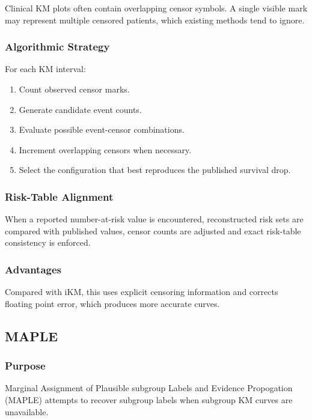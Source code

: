 \documentclass[11pt]{article}
\begin{document}
Clinical KM plots often contain overlapping censor symbols. A single visible mark may represent multiple censored patients, which existing methods tend to ignore.

\subsubsection*{Algorithmic Strategy}

For each KM interval:

\begin{enumerate}
    \item Count observed censor marks.
    \item Generate candidate event counts.
    \item Evaluate possible event-censor combinations.
    \item Increment overlapping censors when necessary.
    \item Select the configuration that best reproduces the published survival drop.
\end{enumerate}

\subsubsection*{Risk-Table Alignment}

When a reported number-at-risk value is encountered, reconstructed risk sets are compared with published values, censor counts are adjusted and exact risk-table consistency is enforced.

\subsubsection*{Advantages}

Compared with iKM, this uses explicit censoring information and corrects floating point error, which produces more accurate curves.

\subsection*{MAPLE}

\subsubsection*{Purpose}

Marginal Assignment of Plausible subgroup Labels and Evidence Propogation (MAPLE) attempts to recover subgroup labels when subgroup KM curves are unavailable.
\end{document}
